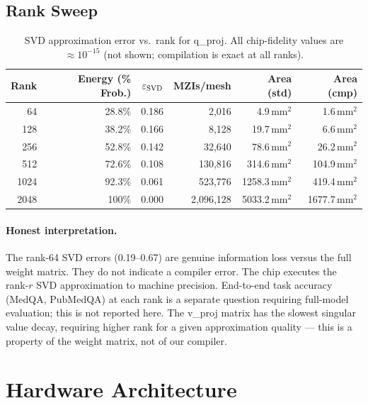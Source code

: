 \documentclass{article}
\begin{document}
\subsection{Rank Sweep}

\begin{table}[h]
\centering
\caption{SVD approximation error vs.\ rank for q\_proj. All chip-fidelity values
         are $\approx 10^{-15}$ (not shown; compilation is exact at all ranks).}
\label{tab:rank_sweep}
\begin{tabular}{rrrrrr}
\toprule
\textbf{Rank} & \textbf{Energy (\% Frob.)} & $\varepsilon_{\rm SVD}$ & \textbf{MZIs/mesh} &
\textbf{Area (std)} & \textbf{Area (cmp)} \\
\midrule
    64 & 28.8\% & 0.186 &        2,016 &    4.9\,mm$^2$ &    1.6\,mm$^2$ \\
   128 & 38.2\% & 0.166 &        8,128 &   19.7\,mm$^2$ &    6.6\,mm$^2$ \\
   256 & 52.8\% & 0.142 &       32,640 &   78.6\,mm$^2$ &   26.2\,mm$^2$ \\
   512 & 72.6\% & 0.108 &      130,816 &  314.6\,mm$^2$ &  104.9\,mm$^2$ \\
  1024 & 92.3\% & 0.061 &      523,776 & 1258.3\,mm$^2$ &  419.4\,mm$^2$ \\
  2048 & 100\%  & 0.000 &    2,096,128 & 5033.2\,mm$^2$ & 1677.7\,mm$^2$ \\
\bottomrule
\end{tabular}
\end{table}

\paragraph{Honest interpretation.}
The rank-64 SVD errors (0.19--0.67) are genuine information loss versus the
full weight matrix.
They do not indicate a compiler error.
The chip executes the rank-$r$ SVD approximation to machine precision.
End-to-end task accuracy (MedQA, PubMedQA) at each rank is a separate question
requiring full-model evaluation; this is not reported here.
The v\_proj matrix has the slowest singular value decay, requiring higher rank
for a given approximation quality --- this is a property of the weight matrix,
not of our compiler.

\section{Hardware Architecture}
\end{document}
